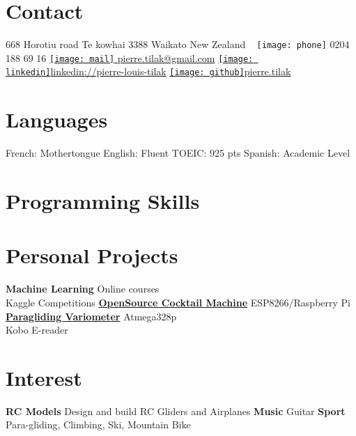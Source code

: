 \documentclass[a4paper]{friggeri-cv} %
\begin{document}


\begin{aside} %
\section{Contact}
668 Horotiu road
Te kowhai
3388 Waikato
New Zealand
~
\texttt{[image: phone]} 0204 188 69 16
\href{mailto:pierre.tilak@gmail.com}{\texttt{[image: mail]} pierre.tilak@gmail.com}
\href{https://www.linkedin.com/pub/pierre-louis-tilak/96/162/a83}{\texttt{[image: linkedin]}linkedin://pierre-louis-tilak}
\href{http://tilaktilak.github.io}{\texttt{[image: github]}pierre.tilak}
\section{Languages}
French: Mothertongue
English: Fluent
TOEIC: 925 pts 
Spanish: Academic Level\bigskip\bigskip
\section{Programming Skills}
\bigskip\bigskip
\section{Personal Projects}
\textbf{Machine Learning}
Online courses\\Kaggle Competitions
\href{https://github.com/tilaktilak/Inebriator}{\textbf{OpenSource Cocktail Machine}}
ESP8266/Raspberry Pi\bigskip
\href{https://github.com/tilaktilak/xcvario}{\textbf{Paragliding Variometer}}
Atmega328p\\ Kobo E-reader\bigskip\bigskip
\section{Interest}
\textbf{RC Models} Design and build RC Gliders and Airplanes
\textbf{Music} Guitar
\textbf{Sport} Para-gliding, Climbing, Ski, Mountain Bike
\end{aside}
\end{document}
